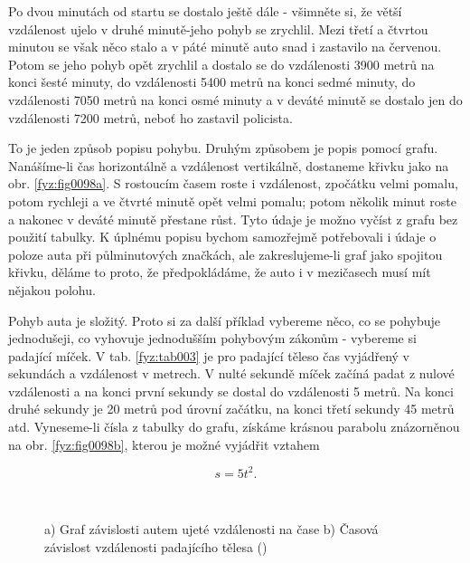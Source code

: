     Po dvou minutách od startu se dostalo ještě dále - všimněte si, že větší vzdálenost ujelo v 
    druhé minutě-jeho pohyb se zrychlil. Mezi třetí a čtvrtou minutou se však něco stalo a v páté 
    minutě auto snad i zastavilo na červenou. Potom se jeho pohyb opět zrychlil a dostalo se do 
    vzdálenosti \num{3900} metrů na konci šesté minuty, do vzdálenosti \num{5400} metrů na konci 
    sedmé minuty, do vzdálenosti \num{7050} metrů na konci osmé minuty a v deváté minutě se dostalo 
    jen do vzdálenosti \num{7200} metrů, neboť ho zastavil policista.

    To je jeden způsob popisu pohybu. Druhým způsobem je popis pomocí grafu. Nanášíme-li čas 
    horizontálně a vzdálenost vertikálně, dostaneme křivku jako na obr. \ref{fyz:fig0098a}. S 
    rostoucím časem roste i vzdálenost, zpočátku velmi pomalu, potom rychleji a ve čtvrté minutě 
    opět velmi pomalu; potom několik minut roste a nakonec v deváté minutě přestane růst. Tyto 
    údaje je možno vyčíst z grafu bez použití tabulky. K úplnému popisu bychom samozřejmě 
    potřebovali i údaje o poloze auta při půlminutových značkách, ale zakreslujeme-li graf jako 
    spojitou křivku, děláme to proto, že předpokládáme, že auto i v mezičasech musí mít nějakou 
    polohu.
    
    Pohyb auta je složitý. Proto si za další příklad vybereme něco, co se pohybuje jednodušeji, co 
    vyhovuje jednodušším pohybovým zákonům - vybereme si padající míček. V tab. \ref{fyz:tab003} je 
    pro padající těleso čas vyjádřený v sekundách a vzdálenost v metrech. V nulté sekundě míček 
    začíná padat z nulové vzdálenosti a na konci první sekundy se dostal do vzdálenosti \num{5} 
    metrů. Na konci druhé sekundy je \num{20} metrů pod úrovní začátku, na konci třetí sekundy 
    \num{45} metrů atd. Vyneseme-li čísla z tabulky do grafu, získáme krásnou parabolu znázorněnou 
    na obr. \ref{fyz:fig0098b}, kterou je možné vyjádřit vztahem
    
    \begin{equation}\label{fyz:eq111}
      s = 5t^2.
    \end{equation}
  
    \begin{figure}[ht!]  %
      \centering
                    \\                                                   
      \caption{a) Graf závislosti autem ujeté vzdálenosti na čase b) Časová závislost vzdálenosti 
               padajícího tělesa (\cite[s.~109]{Feynman01})}
      \label{fyz:fig0098}
    \end{figure}


